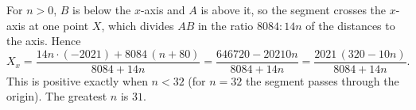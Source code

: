 For $n>0$, $B$ is below the $x$-axis and $A$ is above it, so the segment crosses the $x$-axis at one point $X$, which divides $AB$ in the ratio $8084:14n$ of the distances to the axis. Hence
\[X_x=\dfrac{14n\cdot(-2021)+8084\,(n+80)}{8084+14n}=\dfrac{646720-20210n}{8084+14n}=\dfrac{2021\,(320-10n)}{8084+14n}.\]
This is positive exactly when $n<32$ (for $n=32$ the segment passes through the origin). The greatest $n$ is $\boxed{31}$.
